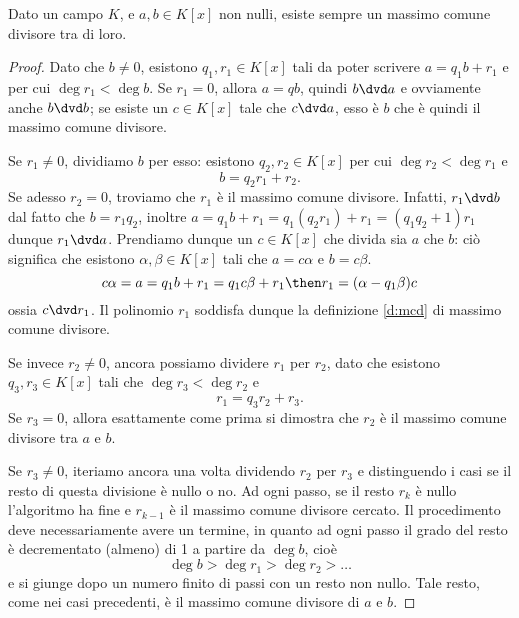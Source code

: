 \begin{teorema} \label{t:esistenza-mcd}
	Dato un campo $K$, e $a,b\in K[x]$ non nulli, esiste sempre un massimo comune divisore tra di loro.
\end{teorema}
\begin{proof}
	Dato che $b\neq 0$, esistono $q_1,r_1\in K[x]$ tali da poter scrivere $a=q_1b+r_1$ e per cui $\deg r_1<\deg b$.
	Se $r_1=0$, allora $a=qb$, quindi $b\dvd a$ e ovviamente anche $b\dvd b$; se esiste un $c\in K[x]$ tale che $c\dvd a$, esso è $b$ che è quindi il massimo comune divisore. %
	
	Se $r_1\ne 0$, dividiamo $b$ per esso: esistono $q_2,r_2\in K[x]$ per cui $\deg r_2<\deg r_1$ e
	\begin{equation}
		b=q_2r_1+r_2.
	\end{equation}
	Se adesso $r_2=0$, troviamo che $r_1$ è il massimo comune divisore.
	Infatti, $r_1\dvd b$ dal fatto che $b=r_1q_2$, inoltre $a=q_1b+r_1=q_1(q_2r_1)+r_1=(q_1q_2+1)r_1$ dunque $r_1\dvd a$.
	Prendiamo dunque un $c\in K[x]$ che divida sia $a$ che $b$: ciò significa che esistono $\alpha,\beta\in K[x]$ tali che $a=c\alpha$ e $b=c\beta$.
	\begin{equation}
		c\alpha=a=q_1b+r_1=q_1c\beta+r_1\then r_1=(\alpha-q_1\beta)c
	\end{equation}
	ossia $c\dvd r_1$.
	Il polinomio $r_1$ soddisfa dunque la definizione \ref{d:mcd} di massimo comune divisore.

	Se invece $r_2\ne 0$, ancora possiamo dividere $r_1$ per $r_2$, dato che esistono $q_3,r_3\in K[x]$ tali che $\deg r_3<\deg r_2$ e
	\begin{equation}
		r_1=q_3r_2+r_3.
	\end{equation}
	Se $r_3=0$, allora esattamente come prima si dimostra che $r_2$ è il massimo comune divisore tra $a$ e $b$.

	Se $r_3\ne 0$, iteriamo ancora una volta dividendo $r_2$ per $r_3$ e distinguendo i casi se il resto di questa divisione è nullo o no.
	Ad ogni passo, se il resto $r_k$ è nullo l'algoritmo ha fine e $r_{k-1}$ è il massimo comune divisore cercato.
	Il procedimento deve necessariamente avere un termine, in quanto ad ogni passo il grado del resto è decrementato (almeno) di 1 a partire da $\deg b$, cioè
	\begin{equation}
		\deg b>\deg r_1>\deg r_2>\dots
	\end{equation}
	e si giunge dopo un numero finito di passi con un resto non nullo.
	Tale resto, come nei casi precedenti, è il massimo comune divisore di $a$ e $b$.
\end{proof}

